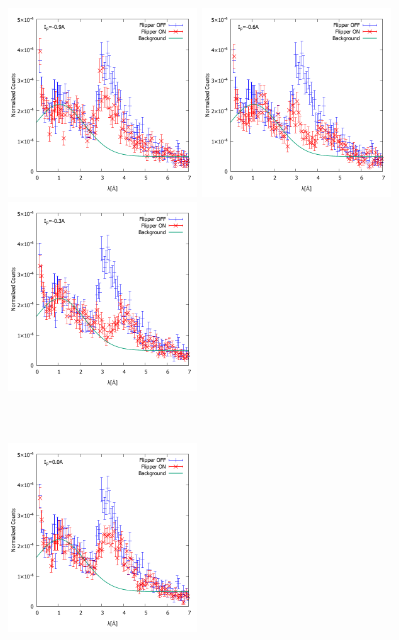 \begin{figure}[h]
\begin{minipage}{0.33\hsize}
\includegraphics[width=5cm]{discussion/NC/NormalizedCounts_-9A.pdf}
\end{minipage}
\begin{minipage}{0.33\hsize}
\includegraphics[width=5cm]{discussion/NC/NormalizedCounts_-6A.pdf}
\end{minipage}
\begin{minipage}{0.33\hsize}
\includegraphics[width=5cm]{discussion/NC/NormalizedCounts_-3A.pdf}
\end{minipage}\\
\begin{minipage}{0.33\hsize}
\includegraphics[width=5cm]{discussion/NC/NormalizedCounts_0A.pdf}

\end{minipage}
\end{figure}
